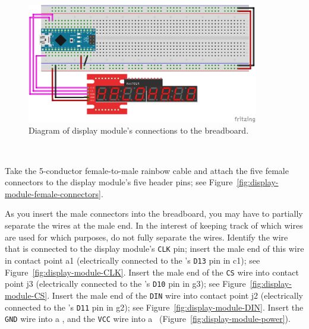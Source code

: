 \begin{figure}
    \centering
    \includegraphics[width=0.9\textwidth]{fritzing_images/display}
    \caption{Diagram of display module's connections to the breadboard.
        \label{fig:display-diagram}}
\end{figure}

\disconnect\

Take the 5-conductor female-to-male rainbow cable and attach the five female
connectors to the display module's five header pins; see
Figure~\ref{fig:display-module-female-connectors}.

As you insert the male connectors into the breadboard, you may have to
partially separate the wires at the male end. In the interest of keeping track
of which wires are used for which purposes, do not fully separate the wires.
Identify the wire that is connected to the display module's \texttt{CLK} pin;
insert the male end of this wire in contact point a1 (electrically connected to
the \nano's \texttt{D13} pin in c1); see Figure~\ref{fig:display-module-CLK}.
Insert the male end of the \texttt{CS} wire into contact point j3 (electrically
connected to the \nano's \texttt{D10} pin in g3); see
Figure~\ref{fig:display-module-CS}. Insert the male end of the \texttt{DIN}
wire into contact point j2 (electrically connected to the \nano's \texttt{D11}
pin in g2); see Figure~\ref{fig:display-module-DIN}. Insert the \texttt{GND}
wire into a \ground, and the \texttt{VCC} wire into a \power\
(Figure~\ref{fig:display-module-power}).

